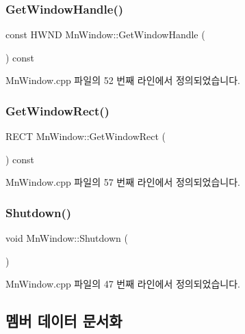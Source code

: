 \subsubsection{\texorpdfstring{Get\+Window\+Handle()}{GetWindowHandle()}}
{\footnotesize\ttfamily const H\+W\+ND Mn\+Window\+::\+Get\+Window\+Handle (\begin{DoxyParamCaption}{ }\end{DoxyParamCaption}) const}



Mn\+Window.\+cpp 파일의 52 번째 라인에서 정의되었습니다.

\mbox{\label{class_m_n_l_1_1_mn_window_a3d3700567955d10c1f95f39c55f3831b}} 
\subsubsection{\texorpdfstring{Get\+Window\+Rect()}{GetWindowRect()}}
{\footnotesize\ttfamily R\+E\+CT Mn\+Window\+::\+Get\+Window\+Rect (\begin{DoxyParamCaption}{ }\end{DoxyParamCaption}) const}



Mn\+Window.\+cpp 파일의 57 번째 라인에서 정의되었습니다.

\mbox{\label{class_m_n_l_1_1_mn_window_a1f403818d6bcf6b50d15ea7dffbbdde6}} 
\subsubsection{\texorpdfstring{Shutdown()}{Shutdown()}}
{\footnotesize\ttfamily void Mn\+Window\+::\+Shutdown (\begin{DoxyParamCaption}{ }\end{DoxyParamCaption})}



Mn\+Window.\+cpp 파일의 47 번째 라인에서 정의되었습니다.



\subsection{멤버 데이터 문서화}
\mbox{\label{class_m_n_l_1_1_mn_window_a520254a97241fe49a2f70ab3291b3aa6}} 
